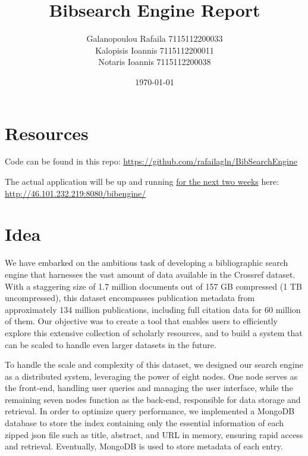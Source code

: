 \documentclass{article}
\begin{document}
\title{Bibsearch Engine Report}
\author{Galanopoulou Rafaila 7115112200033\\
Kalopisis Ioannis 7115112200011\\
 Notaris  Ioannis 7115112200038}
\date{\today}


\maketitle
\newpage
\tableofcontents

\newpage

\section*{Resources}
Code can be found in this repo: \url{https://github.com/rafailagln/BibSearchEngine}

The actual application will be up and running \underline{for the next two weeks}
here: \url{http://46.101.232.219:8080/bibengine/}

\section{Idea}

We have embarked on the ambitious task of developing a bibliographic search engine that 
harnesses the vast amount of data available in the Crossref dataset. With a staggering size 
of 1.7 million documents out of 
157 GB compressed (1 TB uncompressed), this dataset encompasses publication metadata from 
approximately 134 million publications, including full citation data for 60 million of them. 
Our objective was to create a tool that enables users to efficiently explore this extensive 
collection of scholarly resources, and to build a system that can be scaled to handle even 
larger datasets in the future.

To handle the scale and complexity of this dataset, we designed our search engine as a 
distributed system, leveraging the power of eight nodes. One node serves as the front-end, 
handling user queries and managing the user interface, while the remaining seven nodes function 
as the back-end, responsible for data storage and retrieval. In order to optimize query 
performance, we implemented a MongoDB database to store the index containing only the 
essential information of each zipped json file such as title, 
abstract, and URL in memory, ensuring rapid access and retrieval. Eventually, 
MongoDB is used to store metadata of each entry. 
\end{document}
